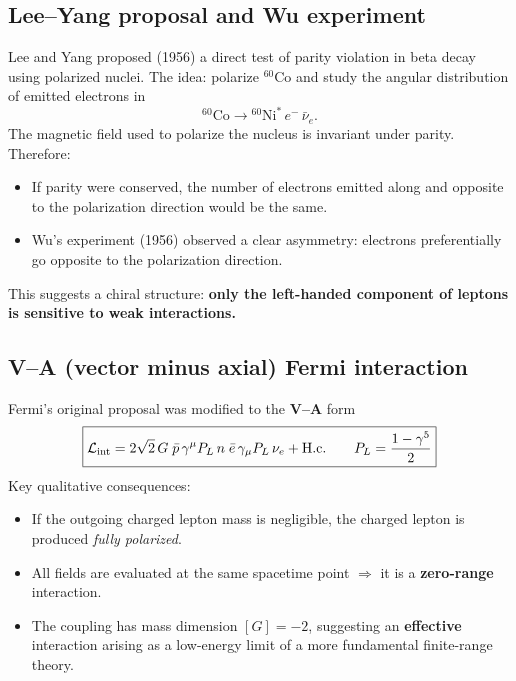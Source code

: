 \subsection{Lee--Yang proposal and Wu experiment}
Lee and Yang proposed (1956) a direct test of parity violation in beta decay using polarized nuclei.
The idea: polarize ${}^{60}$Co and study the angular distribution of emitted electrons in
\begin{equation}
{}^{60}\text{Co}\to {}^{60}\text{Ni}^\ast\,e^-\,\bar\nu_e.
\end{equation}
The magnetic field used to polarize the nucleus is invariant under parity.
Therefore:
\begin{itemize}
  \item If parity were conserved, the number of electrons emitted along and opposite
        to the polarization direction would be the same.
  \item Wu's experiment (1956) observed a clear asymmetry: electrons preferentially go
        opposite to the polarization direction.
\end{itemize}
This suggests a chiral structure: \textbf{only the left-handed component of leptons
is sensitive to weak interactions.}

\subsection{V--A (vector minus axial) Fermi interaction}
Fermi's original proposal was modified to the \textbf{V--A} form
\begin{equation}
\boxed{
\mathcal{L}_{\rm int}
=
2\sqrt{2}\,G\;\bar p\,\gamma^\mu P_L\,n\;\bar e\,\gamma_\mu P_L\,\nu_e
+\text{H.c.}
\qquad
P_L=\frac{1-\gamma^5}{2}
}
\end{equation}
Key qualitative consequences:
\begin{itemize}
  \item If the outgoing charged lepton mass is negligible, the charged lepton is
        produced \emph{fully polarized}.
  \item All fields are evaluated at the same spacetime point $\Rightarrow$ it is a
        \textbf{zero-range} interaction.
  \item The coupling has mass dimension $[G]=-2$, suggesting an \textbf{effective}
        interaction arising as a low-energy limit of a more fundamental finite-range theory.
\end{itemize}


